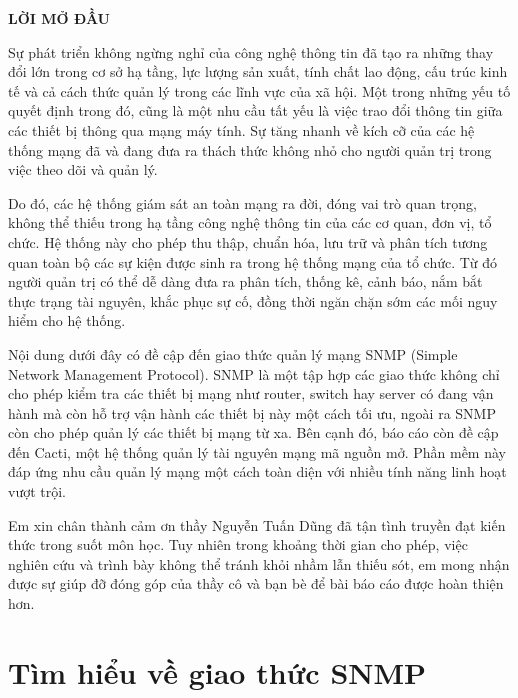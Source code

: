 \documentclass[12pt,oneside,a4paper,reqno]{report}
\begin{document}
\begin{large}
\newpage
\tableofcontents
\newpage
	

\newpage
\vspace*{0.2cm}
\centerline{\Large\bf LỜI MỞ ĐẦU}
\vspace*{0.5cm}

Sự phát triển không ngừng nghỉ của công nghệ thông tin đã tạo ra những thay đổi lớn trong cơ sở hạ tầng, lực lượng sản xuất, tính chất lao động, cấu trúc kinh tế và cả cách thức quản lý trong các lĩnh vực của xã hội. Một trong những yếu tố quyết định trong đó, cũng là một nhu cầu tất yếu là việc trao đổi thông tin giữa các thiết bị thông qua mạng máy tính. Sự tăng nhanh về kích cỡ của các hệ thống mạng đã và đang đưa ra thách thức không nhỏ cho người quản trị trong việc theo dõi và quản lý.

Do đó, các hệ thống giám sát an toàn mạng ra đời, đóng vai trò quan trọng, không thể thiếu trong hạ tầng công nghệ thông tin của các cơ quan, đơn vị, tổ chức. Hệ thống này cho phép thu thập, chuẩn hóa, lưu trữ và phân tích tương quan toàn bộ các sự kiện được sinh ra trong hệ thống mạng của tổ chức. Từ đó người quản trị có thể dễ dàng đưa ra phân tích, thống kê, cảnh báo, nắm bắt thực trạng tài nguyên, khắc phục sự cố, đồng thời ngăn chặn sớm các mối nguy hiểm cho hệ thống.

Nội dung dưới đây có đề cập đến giao thức quản lý mạng SNMP (Simple Network Management Protocol). SNMP là một tập hợp các giao thức không chỉ cho phép kiểm tra các thiết bị mạng như router, switch hay server có đang vận hành mà còn hỗ trợ vận hành các thiết bị này một cách tối ưu, ngoài ra SNMP còn cho phép quản lý các thiết bị mạng từ xa. Bên cạnh đó, báo cáo còn đề cập đến Cacti, một hệ thống quản lý tài nguyên mạng mã nguồn mở. Phần mềm này đáp ứng nhu cầu quản lý mạng một cách toàn diện với nhiều tính năng linh hoạt vượt trội.

Em xin chân thành cảm ơn thầy Nguyễn Tuấn Dũng đã tận tình truyền đạt kiến thức trong suốt môn học. Tuy nhiên trong khoảng thời gian cho phép, việc nghiên cứu và trình bày không thể tránh khỏi nhầm lẫn thiếu sót, em mong nhận được sự giúp đỡ đóng góp của thầy cô và bạn bè để bài báo cáo được hoàn thiện hơn.



\chapter{Tìm hiểu về giao thức SNMP}

\end{large}
\end{document}
